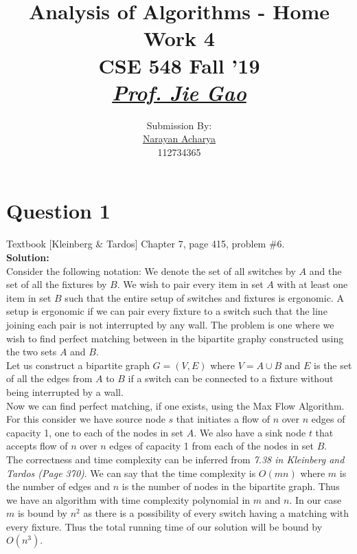 \documentclass[11pt]{article}
\title{
	Analysis of Algorithms - Home Work 4\\[2mm]
	\large CSE 548 Fall '19\\[1mm]
	\href{mailto:jgao@cs.stonybrook.edu}{\textit{Prof. Jie Gao}}
}
\author{
	\small Submission By: \\
	\href{mailto:nacharya@cs.stonybrook.edu}{Narayan Acharya} \\
	\small 112734365
}
\date{\vspace{-5ex}}
\begin{document}
\maketitle
\thispagestyle{fancy} %

\tableofcontents

\clearpage

\section{Question 1} Textbook [Kleinberg \& Tardos] Chapter 7, page 415, problem \#6. \\
\textbf{Solution:} \\

Consider the following notation: We denote the set of all switches by $ A $ and the set of all the fixtures by $ B $. We wish to pair every item in set $ A $ with at least one item in set $ B $ such that the entire setup of switches and fixtures is ergonomic. A setup is ergonomic if we can pair every fixture to a switch such that the line joining each pair is not interrupted by any wall. The problem is one where we wish to find perfect matching between in the bipartite graphy constructed using the two sets $ A $ and $ B $. \\

Let us construct a bipartite graph $ G = (V, E)$ where $ V = A \cup B $
and $ E $ is the set of all the edges from $ A $ to $ B $ if a switch can be connected to a fixture without being interrupted by a wall. \\

Now we can find perfect matching, if one exists, using the Max Flow Algorithm. For this consider we have source node $ s $ that initiates a flow of $ n $ over $ n $ edges of capacity 1, one to each of the nodes in set $ A $. We also have a sink node $ t $ that accepts flow of $ n $ over $ n $ edges of capacity 1 from each of the nodes in set $ B $. \\

The correctness and time complexity can be inferred from \textit{7.38 in Kleinberg and Tardos (Page 370)}. We can say that the time complexity is $ O(mn) $ where $ m $ is the number of edges and $ n $ is the number of nodes in the bipartite graph. Thus we have an algorithm with time complexity polynomial in $ m $ and $ n $. In our case $ m $ is bound by $ n^2 $ as there is a possibility of every switch having a matching with every fixture. Thus the total running time of our solution will be bound by $ O(n^3) $.
\end{document}

